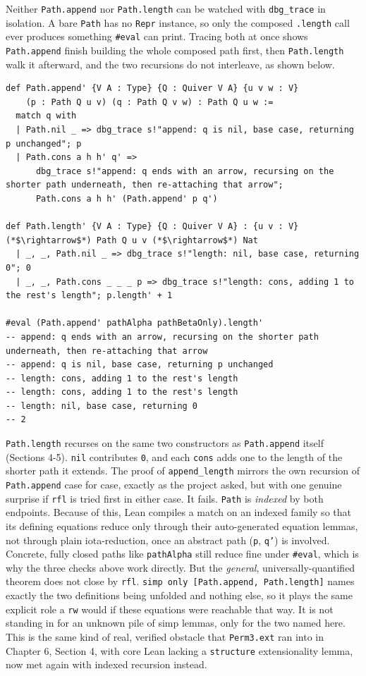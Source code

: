 Neither \texttt{Path.append} nor \texttt{Path.length} can be watched with \texttt{dbg\_\allowbreak{}trace} in isolation. A bare \texttt{Path} has no \texttt{Repr} instance, so only the composed \texttt{.length} call ever produces something \texttt{\#eval} can print. Tracing both at once shows \texttt{Path.append} finish building the whole composed path first, then \texttt{Path.length} walk it afterward, and the two recursions do not interleave, as shown below.

\begin{lstlisting}
def Path.append' {V A : Type} {Q : Quiver V A} {u v w : V}
    (p : Path Q u v) (q : Path Q v w) : Path Q u w :=
  match q with
  | Path.nil _ => dbg_trace s!"append: q is nil, base case, returning p unchanged"; p
  | Path.cons a h h' q' =>
      dbg_trace s!"append: q ends with an arrow, recursing on the shorter path underneath, then re-attaching that arrow";
      Path.cons a h h' (Path.append' p q')

def Path.length' {V A : Type} {Q : Quiver V A} : {u v : V} (*$\rightarrow$*) Path Q u v (*$\rightarrow$*) Nat
  | _, _, Path.nil _ => dbg_trace s!"length: nil, base case, returning 0"; 0
  | _, _, Path.cons _ _ _ p => dbg_trace s!"length: cons, adding 1 to the rest's length"; p.length' + 1

#eval (Path.append' pathAlpha pathBetaOnly).length'
-- append: q ends with an arrow, recursing on the shorter path underneath, then re-attaching that arrow
-- append: q is nil, base case, returning p unchanged
-- length: cons, adding 1 to the rest's length
-- length: cons, adding 1 to the rest's length
-- length: nil, base case, returning 0
-- 2
\end{lstlisting}

\texttt{Path.length} recurses on the same two constructors as \texttt{Path.append} itself (Sections 4-5). \texttt{nil} contributes \texttt{0}, and each \texttt{cons} adds one to the length of the shorter path it extends. The proof of \texttt{append\_\allowbreak{}length} mirrors the own recursion of \texttt{Path.append} case for case, exactly as the project asked, but with one genuine surprise if \texttt{rfl} is tried first in either case. It fails. \texttt{Path} is \emph{indexed} by both endpoints. Because of this, Lean compiles a match on an indexed family so that its defining equations reduce only through their auto-generated equation lemmas, not through plain iota-reduction, once an abstract path (\texttt{p}, \texttt{q'}) is involved. Concrete, fully closed paths like \texttt{pathAlpha} still reduce fine under \texttt{\#eval}, which is why the three checks above work directly. But the \emph{general}, universally-quantified theorem does not close by \texttt{rfl}. \texttt{simp only [Path.append, Path.length]} names exactly the two definitions being unfolded and nothing else, so it plays the same explicit role a \texttt{rw} would if these equations were reachable that way. It is not standing in for an unknown pile of simp lemmas, only for the two named here. This is the same kind of real, verified obstacle that \texttt{Perm3.ext} ran into in Chapter 6, Section 4, with core Lean lacking a \texttt{structure} extensionality lemma, now met again with indexed recursion instead.
